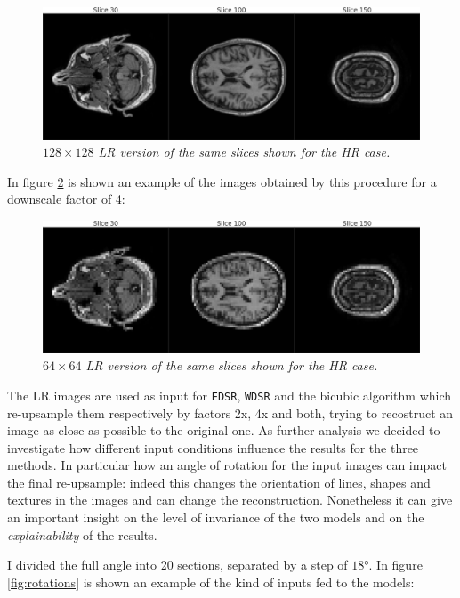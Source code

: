 \documentclass[12pt,a4paper]{report}
\begin{document}
\begin{figure}[H]
 \centering
 \includegraphics[scale=0.3]{images/inp2_slice_comp.png}
 \caption{\it $128 \times 128$ LR version of the same slices shown for the HR case.}
 \label{fig:inp2}
\end{figure}

In figure \ref{fig:inp4} is shown an example of the images obtained by this procedure for a downscale factor of 4:

\begin{figure}[H]
 \centering
 \includegraphics[scale=0.3]{images/inp4_slice_comp.png}
 \caption{\it $64 \times 64$ LR version of the same slices shown for the HR case.}
 \label{fig:inp4}
\end{figure}

The LR images are used as input for {\tt EDSR}, {\tt WDSR} and the bicubic algorithm which re-upsample them respectively by factors 2x, 4x and both, trying to recostruct an image as close as possible to the original one.
As further analysis we decided to investigate how different input conditions influence the results for the three methods. 
In particular how an angle of rotation for the input images can impact the final re-upsample: indeed this changes the orientation of lines, shapes and textures in the images and can change the reconstruction. 
Nonetheless it can give an important insight on the level of invariance of the two models and on the {\it explainability} of the results. 

I divided the full angle into 20 sections, separated by a step of $18$°. In figure \ref{fig:rotations} is shown an example of the kind of inputs fed to the models:
\end{document}
